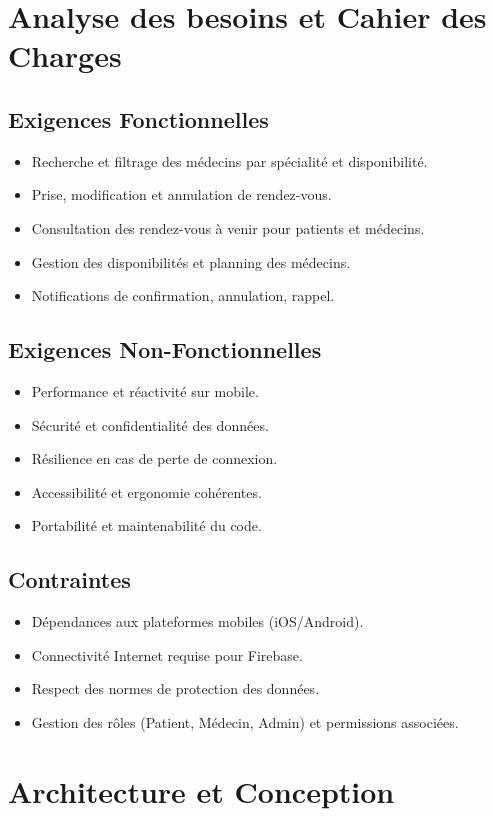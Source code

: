 \documentclass[12pt,a4paper]{report}
\begin{document}
\chapter{Analyse des besoins et Cahier des Charges}
\section{Exigences Fonctionnelles}
\begin{itemize}
\item Recherche et filtrage des médecins par spécialité et disponibilité.
\item Prise, modification et annulation de rendez-vous.
\item Consultation des rendez-vous à venir pour patients et médecins.
\item Gestion des disponibilités et planning des médecins.
\item Notifications de confirmation, annulation, rappel.
\end{itemize}
\section{Exigences Non-Fonctionnelles}
\begin{itemize}
\item Performance et réactivité sur mobile.
\item Sécurité et confidentialité des données.
\item Résilience en cas de perte de connexion.
\item Accessibilité et ergonomie cohérentes.
\item Portabilité et maintenabilité du code.
\end{itemize}
\section{Contraintes}
\begin{itemize}
\item Dépendances aux plateformes mobiles (iOS/Android).
\item Connectivité Internet requise pour Firebase.
\item Respect des normes de protection des données.
\item Gestion des rôles (Patient, Médecin, Admin) et permissions associées.
\end{itemize}
\chapter{Architecture et Conception}
\end{document}

